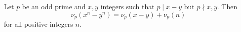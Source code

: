 Let $p$ be an odd prime and $x,y$ integers such that $p\mid x-y$ but $p\nmid x,y$. Then \[\nu_p\left(x^n-y^n\right)=\nu_p\left(x-y\right)+\nu_p\left(n\right)\] for all positive integers $n$.